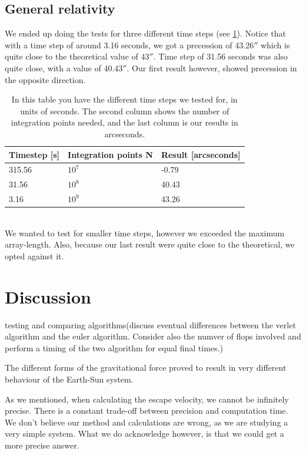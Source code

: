 \documentclass[reprint, english,notitlepage,nofootinbib]{revtex4-1}  %
\begin{document}
\subsection{General relativity}

We ended up doing the tests for three different time steps (see \ref{tab:general_relativity}). Notice that with a time step of around 3.16 seconds, we got a precession of 43.26$''$ which is quite close to the theoretical value of 43$''$. Time step of 31.56 seconds was also quite close, with a value of 40.43$''$. Our first result however, showed precession in the opposite direction.
\begin{table}[h]
	\begin{tabular}{|l|l|l|}
		\hline
		Timestep {[}s{]} & Integration points N & Result {[}arcseconds{]} \\
		\hline
		315.56              & $10^7$          & -0.79               \\
		31.56               & $10^8$          & 40.43                 \\
		3.16                & $10^9$          & 43.26	\\
		\hline
	\end{tabular}
	\caption{In this table you have the different time steps we tested for, in units of seconds. The second column shows the number of integration points needed, and the last column is our results in arcseconds.
	\label{tab:general_relativity}}
\end{table}
\\
We wanted to test for smaller time steps, however we exceeded the maximum array-length. Also, because our last result were quite close to the theoretical, we opted against it.



\section{Discussion}

testing and comparing algorithms(discuss eventual differences between the verlet algorithm and the euler algorithm. Consider also the numver of flops involved and perform a timing of the two algorithm for equal final times.)

The different forms of the gravitational force proved to result in very different behaviour of the Earth-Sun system.

As we mentioned, when calculating the escape velocity, we cannot be infinitely precise. There is a constant trade-off between precision and computation time. We don't believe our method and calculations are wrong, as we are studying a very simple system. What we do acknowledge however, is that we could get a more precise answer.
\end{document}
